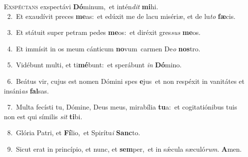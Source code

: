 \lettrine{\initial\textcolor{\initialcolor}{E}}{xspéctans} exspectávi \textbf{Dó}\-minum,~\star et intén\textit{dit} \textbf{mi}\-hi.\\
{\numbfont\textcolor{\numbcolor}{~2.}}~Et exaudívit preces \textbf{me}\-as:~\star et edúxit me de lacu misériæ, et de lu\textit{to} \textbf{fæ}\-cis.\par
{\numbfont\textcolor{\numbcolor}{~3.}}~Et státuit super petram pedes \textbf{me}\-os:~\star et diréxit gres\textit{sus} \textbf{me}\-os.\par
{\numbfont\textcolor{\numbcolor}{~4.}}~Et immísit in os meum cánticum \textbf{no}\-vum~\star carmen De\textit{o} \textbf{nos}\-tro.\par
{\numbfont\textcolor{\numbcolor}{~5.}}~Vidébunt multi, et ti\-\textbf{mé}\-bunt:~\star et sperábunt \textit{in} \textbf{Dó}\-mino.\par
{\numbfont\textcolor{\numbcolor}{~6.}}~Beátus vir, cujus est nomen Dómini spes \textbf{e}\-jus~\star et non respéxit in vanitátes et insáni\textit{as} \textbf{fal}\-sas.\par
{\numbfont\textcolor{\numbcolor}{~7.}}~Multa fecísti tu, Dómine, Deus meus, mirabília \textbf{tu}\-a:~\star et cogitatiónibus tuis non est qui símilis \textit{sit} \textbf{ti}\-bi.\par
{\numbfont\textcolor{\numbcolor}{~8.}}~Glória Patri, et \textbf{Fí}\-lio,~\star et Spirítu\textit{i} \textbf{Sanc}\-to.\par
{\numbfont\textcolor{\numbcolor}{~9.}}~Sicut erat in princípio, et nunc, et \textbf{sem}\-per,~\star et in sǽcula sæculó\-\textit{rum}\-. \textbf{A}\-men.\par
